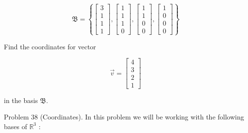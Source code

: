 \documentclass[10pt]{article}
\begin{document}
$$
\mathfrak{B}=\left\{\left[\begin{array}{l}
3 \\
1 \\
1 \\
1
\end{array}\right],\left[\begin{array}{l}
1 \\
1 \\
1 \\
0
\end{array}\right],\left[\begin{array}{l}
1 \\
1 \\
0 \\
0
\end{array}\right],\left[\begin{array}{l}
1 \\
0 \\
0 \\
0
\end{array}\right]\right\}
$$

Find the coordinates for vector

$$
\vec{v}=\left[\begin{array}{l}
4 \\
3 \\
2 \\
1
\end{array}\right]
$$

in the basis $\mathfrak{B}$.

Problem 38 (Coordinates). In this problem we will be working with the following bases of $\mathbb{R}^{3}$ :
\end{document}
